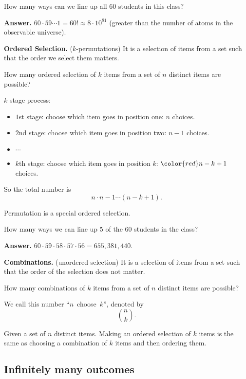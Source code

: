   \begin{example}
    How many ways can we line up all $60$ students in this class?
  \end{example}
  \textbf{Answer.} $60\cdot 59\cdots 1 = 60! \approx 8\cdot 10^{81}$ (greater
  than the number of atoms in the observable universe).

  \textbf{Ordered Selection.} ($k$-permutations) It is a selection of items from
  a set such that the order we select them matters.

  How many ordered selection of $k$ items from a set of $n$ distinct items are
  possible?

  $k$ stage process:
  \begin{itemize}
  \item $1$st stage: choose which item goes in position one: $n$ choices.
  \item $2$nd stage: choose which item goes in position two: $n-1$ choices.
  \item $\cdots$
  \item $k$th stage: choose which item goes in position $k$: ${\color{red}
      n-k+1} $ choices.
  \end{itemize}

  So the total number is
  \[
    n\cdot n-1\cdots (n-k+1).
  \]

  \begin{remark}
   Permutation is a special ordered selection. 
  \end{remark}

  \begin{example}
    How many ways we can line up $5$ of the $60$ students in the class?
  \end{example}

  \textbf{Answer.} $60\cdot 59\cdot 58\cdot 57\cdot 56 = 655,381,440$.

  \textbf{Combinations.} (unordered selection) It is a selection of items from a
  set such that the order of the selection does not matter.

  How many combinations of $k$ items from a set of $n$ distinct items are
  possible?

  We call this number ``$n$~choose~$k$'', denoted by
  \[
    \binom{n}{k}.
  \]

  Given a set of $n$ distinct items. Making an ordered selection of $k$ items is
  the same as choosing a combination of $k$ items and then ordering them.


  
  \subsection{Infinitely many outcomes}
  \label{subsec:1.3}

